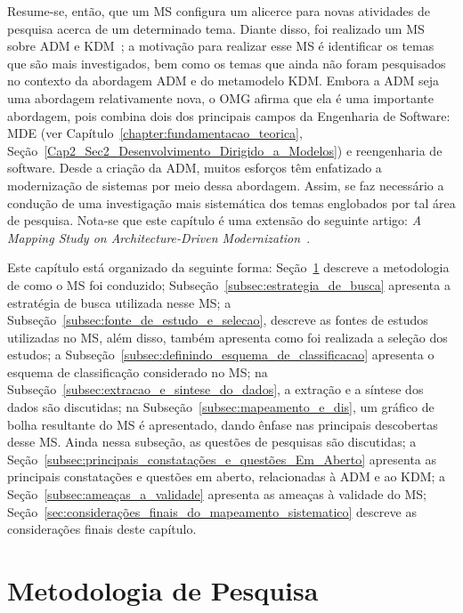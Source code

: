 Resume-se, então, que um MS configura um alicerce para novas atividades de pesquisa acerca de um determinado tema. Diante disso, foi realizado um MS sobre ADM e KDM~\cite{durelli_systematic_mapping}; a motivação para realizar esse MS é identificar os temas que são mais investigados, bem como os temas que ainda não foram pesquisados no contexto da abordagem ADM e do metamodelo KDM. Embora a ADM seja uma abordagem relativamente nova, o OMG afirma que ela é uma importante abordagem, pois combina dois dos principais campos da Engenharia de Software: MDE (ver Capítulo~\ref{chapter:fundamentacao_teorica}, Seção~\ref{Cap2_Sec2_Desenvolvimento_Dirigido_a_Modelos}) e reengenharia de software. Desde a criação da ADM, muitos esforços têm enfatizado a modernização de sistemas por meio dessa abordagem. Assim, se faz necessário a condução de uma investigação mais sistemática dos temas englobados por tal área de pesquisa. Nota-se que este capítulo é uma extensão do seguinte artigo: \textit{A Mapping Study on Architecture-Driven Modernization}~\cite{durelli_systematic_mapping}.


Este capítulo está organizado da seguinte forma: Seção~\ref{sec:metodologia_pesquisa} descreve a metodologia de como o MS foi conduzido;  Subseção~\ref{subsec:estrategia_de_busca} apresenta a estratégia de busca utilizada nesse MS; a Subseção~\ref{subsec:fonte_de_estudo_e_selecao}, descreve as fontes de estudos utilizadas no MS, além disso, também apresenta como foi realizada a seleção dos estudos; a Subseção~\ref{subsec:definindo_esquema_de_classificacao} apresenta o esquema de classificação considerado no MS; na Subseção~\ref{subsec:extracao_e_sintese_do_dados}, a extração e a síntese dos dados são discutidas; na Subseção~\ref{subsec:mapeamento_e_dis}, um gráfico de bolha resultante do MS é apresentado, dando ênfase nas principais descobertas desse MS. Ainda nessa subseção, as questões de pesquisas são discutidas; a Seção~\ref{subsec:principais_constatações_e_questões_Em_Aberto} apresenta as principais constatações e questões em aberto, relacionadas à ADM e ao KDM; a Seção~\ref{subsec:ameaças_a_validade} apresenta as ameaças à validade do MS; Seção~\ref{sec:considerações_finais_do_mapeamento_sistematico} descreve as considerações finais deste capítulo.



\section{Metodologia de Pesquisa}\label{sec:metodologia_pesquisa}

